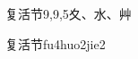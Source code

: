 \begin{entry}{复活节}{9,9,5}{⼢、⽔、⾋}
  \begin{phonetics}{复活节}{fu4huo2jie2}
  \end{phonetics}
\end{entry}
